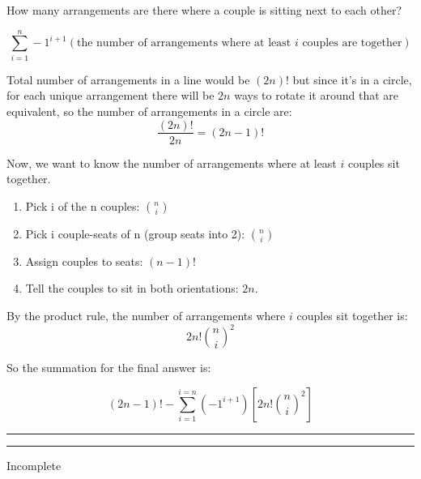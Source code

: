 \documentclass[11pt,letterpaper]{article}
\newcommand{\question}[2] {\vspace{.25in} \hrule\vspace{0.5em}
\noindent{\bf #1: #2} \vspace{0.5em}
\hrule \vspace{.10in}}
\begin{document}
How many arrangements are there where a couple is sitting next to each other?

$$\sum_{i=1}^{n} -1^{i+1} (\text{the number of arrangements where at least } i \text{ couples are together}) $$

Total number of arrangements in a line would be $(2n)!$ but since it's in a circle, for each unique arrangement
there will be $2n$ ways to rotate it around that are equivalent, so the number of arrangements in a circle are:
$$\frac{(2n)!}{2n} = (2n-1)!$$

Now, we want to know the number of arrangements where at least $i$ couples sit together.
\begin{enumerate}
\item Pick i of the n couples: ${n \choose i}$
\item Pick i couple-seats of n (group seats into 2): ${n \choose i}$
\item Assign couples to seats: $ (n-1)! $
\item Tell the couples to sit in both orientations: $2n$.
\end{enumerate}
By the product rule, the number of arrangements where $i$ couples sit together is:
$$ 2n!{n \choose i}^2 $$

So the summation for the final answer is:

$$(2n-1)! - \sum_{i=1}^{i=n} (-1^{i+1}) [2n!{n \choose i}^2]$$

\question{8}{8}

Incomplete
\end{document}
